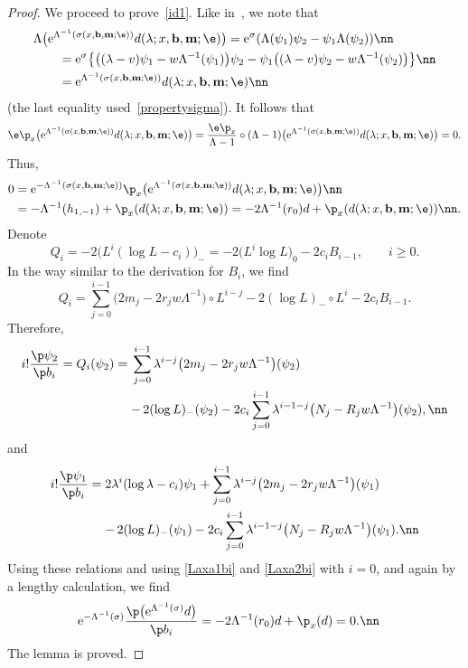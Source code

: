 \begin{proof}
We proceed to prove~\eqref{id1}. Like in~\cite{Y}, we note that
\begin{align*}
&\Lambda \bigl({\rm e}^{\Lambda^{-1}(\sigma(x,{\bf b},{\bf m};\e))}d(\lambda; x,{\bf b}, {\bf m};\e)\bigr)
 = {\rm e}^{\sigma} (\Lambda(\psi_1) \psi_2
- \psi_1 \Lambda( \psi_2) ) \nn\\
&\qquad{} = {\rm e}^{\sigma} \bigl\{ \bigl((\lambda-v) \psi_1 - w \Lambda^{-1}(\psi_1)\bigr) \psi_2 - \psi_1 \bigl((\lambda-v) \psi_2 - w \Lambda^{-1}(\psi_2)\bigr) \bigr\} \nn\\
&\qquad{} = {\rm e}^{\Lambda^{-1}(\sigma(x, {\bf b},{\bf m};\e))}d(\lambda; x,{\bf b}, {\bf m};\e) \nn
\end{align*}
(the last equality used~\eqref{propertysigma}).
It follows that
\[
\e\p_x \bigl({\rm e}^{\Lambda^{-1}(\sigma(x,{\bf b},{\bf m};\e))}d(\lambda; x, {\bf b}, {\bf m};\e)\bigr)
= \frac{\e\p_x}{\Lambda-1} \circ (\Lambda-1) \bigl({\rm e}^{\Lambda^{-1}(\sigma(x, {\bf b},{\bf m};\e))}
d(\lambda; x, {\bf b}, {\bf m};\e)\bigr) = 0.
\]
Thus,
\begin{align}
0 & = {\rm e}^{-\Lambda^{-1}(\sigma(x,{\bf b},{\bf m};\e))} \p_x \bigl({\rm e}^{\Lambda^{-1}(\sigma(x,{\bf b},{\bf m};\e))}d(\lambda; x, {\bf b}, {\bf m};\e)\bigr) \nn\\
& = - \Lambda^{-1}(h_{1,-1}) + \p_x(d(\lambda; x, {\bf b}, {\bf m};\e)) = - 2\Lambda^{-1}(r_0)d + \p_x(d(\lambda; x, {\bf b}, {\bf m};\e))\nn.
\end{align}
Denote
\[
Q_i = -2 \bigl(L^i(\log L-c_i)\bigr)_- = -2 \bigl(L^i \log L\bigr)_0-2c_i B_{i-1}, \qquad i\ge0.
\]
In the way similar to the derivation for $B_i$, we find
\[
Q_i= \sum_{j=0}^{i-1} \bigl(2m_j-2r_jw\Lambda^{-1}\bigr) \circ L^{i-j} - 2 (\log L)_- \circ L^i - 2c_i B_{i-1}.
\]
Therefore,
\begin{align*}%
i! \frac{\p \psi_2}{\p b_i} = Q_i (\psi_2)={}&{}
 \sum_{j=0}^{i-1} \lambda^{i-j} \bigl(2m_j-2r_jw\Lambda^{-1}\bigr) (\psi_2)\\
&{}{-}\, 2 (\log L)_- (\psi_2)
-2c_i\sum_{j=0}^{i-1} \lambda^{i-1-j} \bigl(N_j-R_j w\Lambda^{-1}\bigr) (\psi_2),\nn
\end{align*}
and
\begin{align*}%
i! \frac{\p \psi_1}{\p b_i} %
={}&{}2 \lambda^i(\log\lambda-c_i) \psi_1+ \sum_{j=0}^{i-1} \lambda^{i-j} \bigl(2m_j-2r_jw\Lambda^{-1}\bigr) (\psi_1)\\
&{}{-}\, 2 (\log L)_- (\psi_1)
-2c_i\sum_{j=0}^{i-1} \lambda^{i-1-j} \bigl(N_j-R_j w\Lambda^{-1}\bigr) (\psi_1).\nn
\end{align*}
Using these relations and using \eqref{Laxa1bi} and \eqref{Laxa2bi} with $i=0$, and again by a lengthy calculation, we find
\begin{align}
& {\rm e}^{-\Lambda^{-1}(\sigma)}\frac{\p \bigl({\rm e}^{\Lambda^{-1}(\sigma)}d\bigr)}{\p b_i}
= - 2\Lambda^{-1}(r_0)d + \p_x(d) = 0. \nn
\end{align}
The lemma is proved.
\end{proof}

